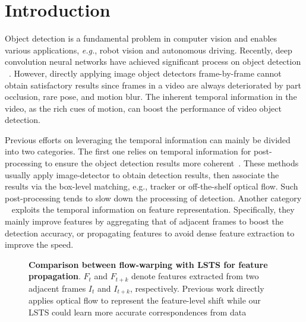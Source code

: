\documentclass[runningheads]{llncs}
\begin{document}
\section{Introduction}

Object detection is a fundamental problem in computer vision and enables various applications, {\em e.g.}, robot vision and autonomous driving. Recently, deep convolution neural networks have achieved significant process on object detection ~\cite{girshick2014rich,ren2015faster,liu2016ssd,lin2017feature,he2017mask}. However, directly applying image object detectors frame-by-frame cannot obtain satisfactory results since frames in a video are always deteriorated by part occlusion, rare pose, and motion blur. The inherent temporal information in the video, as the rich cues of motion, can boost the performance of video object detection. 

Previous efforts on leveraging the temporal information can mainly be divided into two categories. The first one  relies on temporal information for post-processing to ensure the object detection results more coherent~\cite{kang2016object,kang2017object,han2016seq}. These methods usually apply image-detector to obtain detection results, then associate the results via the box-level matching, e.g., tracker or off-the-shelf optical flow. Such post-processing tends to slow down the processing of detection. Another category ~\cite{wang2018fully,zhu2018towards,zhu2017deep,zhu2017flow,hetang2017impression,Jiang2019VideoOD,wu2019sequence,shvets2019leveraging,jiang2019learning} exploits the temporal information on feature representation. Specifically, they mainly improve features by aggregating that of adjacent frames to boost the detection accuracy, or propagating features to avoid dense feature extraction to improve the speed.

\begin{figure}[t]
\centering
{}\caption{
\textbf{Comparison between flow-warping with LSTS for feature propagation}.
$F_t$ and $F_{t+k}$ denote features extracted from two adjacent frames $I_t$ and $I_{t+k}$, respectively. Previous work directly applies optical flow to represent the feature-level shift while our LSTS could learn more accurate correspondences from data
}
\label{flow-warping-lsts}
\end{figure}
\end{document}
